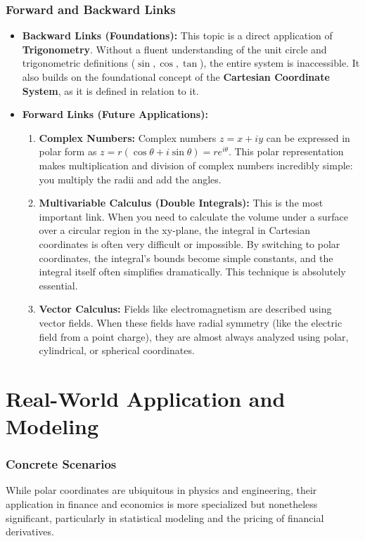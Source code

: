 \documentclass{article}
\begin{document}
\section{Forward and Backward Links}
\begin{itemize}
    \item \textbf{Backward Links (Foundations):} This topic is a direct application of \textbf{Trigonometry}. Without a fluent understanding of the unit circle and trigonometric definitions (\( \sin, \cos, \tan \)), the entire system is inaccessible. It also builds on the foundational concept of the \textbf{Cartesian Coordinate System}, as it is defined in relation to it.

    \item \textbf{Forward Links (Future Applications):}
    \begin{enumerate}
        \item \textbf{Complex Numbers:} Complex numbers \(z = x + iy\) can be expressed in polar form as \(z = r(\cos\theta + i\sin\theta) = re^{i\theta}\). This polar representation makes multiplication and division of complex numbers incredibly simple: you multiply the radii and add the angles.
        \item \textbf{Multivariable Calculus (Double Integrals):} This is the most important link. When you need to calculate the volume under a surface over a circular region in the xy-plane, the integral in Cartesian coordinates is often very difficult or impossible. By switching to polar coordinates, the integral's bounds become simple constants, and the integral itself often simplifies dramatically. This technique is absolutely essential.
        \item \textbf{Vector Calculus:} Fields like electromagnetism are described using vector fields. When these fields have radial symmetry (like the electric field from a point charge), they are almost always analyzed using polar, cylindrical, or spherical coordinates.
    \end{enumerate}
\end{itemize}

\part{Real-World Application and Modeling}

\section{Concrete Scenarios}
While polar coordinates are ubiquitous in physics and engineering, their application in finance and economics is more specialized but nonetheless significant, particularly in statistical modeling and the pricing of financial derivatives.
\end{document}
